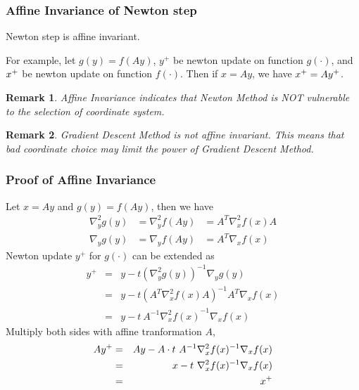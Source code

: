 \documentclass{beamer}
\newcommand{\be}{\begin{eqnarray}}
\newcommand{\ee}{\end{eqnarray}}
\newtheorem{remark}{Remark}
\begin{document}
%

\newcommand{\yp}{\ensuremath{y^{+}}}
\newcommand{\gradient}[3]{\ensuremath{\nabla_{#1} #2 (#3)}}
\newcommand{\hessian}[3]{\ensuremath{\nabla^2_{#1} #2 (#3)}}
\newcommand{\inv}{^{-1}}
\begin{frame}
\frametitle{Affine Invariance of Newton step}
\begin{lemma}
    Newton step is affine invariant. 
\end{lemma}

For example, let $g(y) = f(Ay)$, $\yp$ be newton update on function
$g(\cdot)$, and 
$x^{+}$ be newton update on function $f(\cdot)$. 
Then if $x=Ay$, we have $\xp = A\yp$.

\begin{remark}
    Affine Invariance indicates that Newton Method is NOT vulnerable to the
    selection of coordinate system. 
\end{remark}
\begin{remark}
    Gradient Descent Method is not affine invariant. This means
    that bad coordinate choice may limit the power of Gradient Descent Method.
\end{remark}
\end{frame}

\begin{frame}
\frametitle{Proof of Affine Invariance}
    Let $x = Ay$ and $g(y) = f(Ay)$, then we have
    \be
    \hessian{y}{g}{y} &= \hessian{y}{f}{Ay} &= A^T \hessian{x}{f}{x} A \\
    \gradient{y}{g}{y} &= \gradient{y}{f}{Ay} &= A^T \gradient{x}{f}{x}
    \ee
    Newton update $\yp$ for $g(\cdot)$ can be extended as
    \be
    \yp &=& y - t(\hessian{y}{g}{y})\inv \gradient{y}{g}{y} \\
    &=& y - t(A^T \hessian{x}{f}{x} A)\inv A^T \gradient{x}{f}{x} \\
    &=& y - t\ A\inv \hessian{x}{f}{x}\inv \gradient{x}{f}{x}
    \ee
    Multiply both sides with affine tranformation $A$, 
    \be
    A\yp &=& Ay - A \cdot t\ A\inv \hessian{x}{f}{x}\inv \gradient{x}{f}{x} \\
    &=& x - t\ \hessian{x}{f}{x}\inv \gradient{x}{f}{x} \\
    &=& \xp
    \ee
\end{frame}
\end{document}
